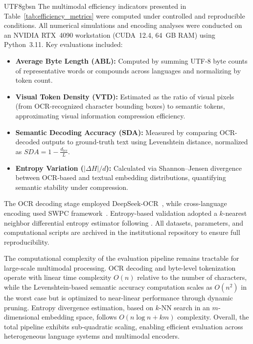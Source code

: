 \documentclass[conference]{IEEEtran}
\begin{document}
\begin{CJK*}{UTF8}{gbsn}
The multimodal efficiency indicators presented in Table~\ref{tab:efficiency_metrics} were computed under controlled and reproducible conditions. All numerical simulations and encoding analyses were conducted on an NVIDIA RTX~4090 workstation (CUDA~12.4, 64~GB RAM) using Python~3.11. Key evaluations included:

\begin{itemize}
    \item \textbf{Average Byte Length (ABL):} Computed by summing UTF-8 byte counts of representative words or compounds across languages and normalizing by token count.
    \item \textbf{Visual Token Density (VTD):} Estimated as the ratio of visual pixels (from OCR-recognized character bounding boxes) to semantic tokens, approximating visual information compression efficiency.
    \item \textbf{Semantic Decoding Accuracy (SDA):} Measured by comparing OCR-decoded outputs to ground-truth text using Levenshtein distance, normalized as $SDA = 1 - \frac{d_{lev}}{L}$.
    \item \textbf{Entropy Variation ($|\Delta H|/d$):} Calculated via Shannon–Jensen divergence between OCR-based and textual embedding distributions, quantifying semantic stability under compression.
\end{itemize}

The OCR decoding stage employed DeepSeek-OCR~\cite{wei2025deepseek}, while cross-language encoding used SWPC  framework~\cite{weigang2024six}. Entropy-based validation adopted a $k$-nearest neighbor differential entropy estimator following \cite{belghazi2018mutual}. All datasets, parameters, and computational scripts are archived in the institutional repository to ensure full reproducibility.

The computational complexity of the evaluation pipeline remains tractable for large-scale multimodal processing. OCR decoding and byte-level tokenization operate with linear time complexity $O(n)$ relative to the number of characters, while the Levenshtein-based semantic accuracy computation scales as $O(n^2)$ in the worst case but is optimized to near-linear performance through dynamic pruning. Entropy divergence estimation, based on $k$-NN search in an $m$-dimensional embedding space, follows $O(n \log n + km)$ complexity. Overall, the total pipeline exhibits sub-quadratic scaling, enabling efficient evaluation across heterogeneous language systems and multimodal encoders.


\end{CJK*}
\end{document}
